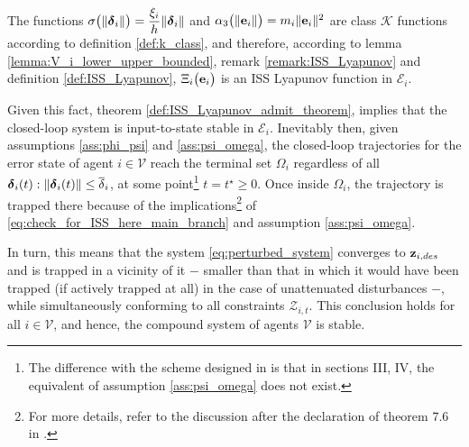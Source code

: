 The functions
$\sigma\big(\|\bm{\mathbf{\delta}}_i\|\big) = \dfrac{\xi_i}{h} \|\bm{\mathbf{\delta}}_i\|$
and $\alpha_3\big(\|\bm{\mathbf{e}}_i\|\big) = m_i \|\bm{\mathbf{e}}_i\|^2$ are class
$\mathcal{K}$ functions according to definition \eqref{def:k_class},
and therefore, according to lemma \eqref{lemma:V_i_lower_upper_bounded},
remark \eqref{remark:ISS_Lyapunov} and definition \eqref{def:ISS_Lyapunov},
$\Xi_i\big(\bm{\mathbf{e}}_i\big)$ is an ISS Lyapunov function in $\mathcal{E}_i$.

Given this fact, theorem \eqref{def:ISS_Lyapunov_admit_theorem}, implies that
the closed-loop system is input-to-state stable in $\mathcal{E}_i$. Inevitably then,
given assumptions \eqref{ass:phi_psi} and \eqref{ass:psi_omega}, the closed-loop
trajectories for the error state of agent $i \in \mathcal{V}$ reach
the terminal set $\Omega_i$ regardless of all
$\bm{\mathbf{\delta}}_i(t) : \|\bm{\mathbf{\delta}}_i(t)\| \leq \overline{\delta}_i$, at
some point\footnote{The difference with the scheme designed in
\cite{ISS_SKATOLINI} is that in sections III, IV, the equivalent of assumption
\eqref{ass:psi_omega} does not exist.} $t = t^{\star} \geq 0$. Once inside
$\Omega_i$, the trajectory is trapped there because of the
implications\footnote{For more details, refer to the discussion after the
declaration of theorem $7.6$ in \cite{marquez2003nonlinear}.} of
\eqref{eq:check_for_ISS_here_main_branch} and assumption \eqref{ass:psi_omega}.

In turn, this means that the system \eqref{eq:perturbed_system} converges
to $\bm{\mathbf{z}}_{i,des}$ and is trapped in a vicinity of it $-$ smaller than that
in which it would have been trapped (if actively trapped at all)
in the case of unattenuated disturbances $-$, while simultaneously
conforming to all constraints $\mathcal{Z}_{i,t}$. This conclusion holds
for all $i \in \mathcal{V}$, and hence, the compound system of agents
$\mathcal{V}$ is stable.
\qedsymbol


